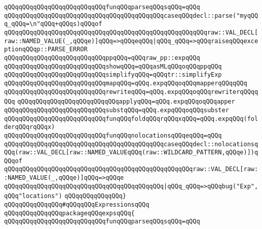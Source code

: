 \verb|qQQqqQQqqQQqqQQqqQQqqQQqqQQqfunqQQqparseqQQqsqQQq=qQQq|\newline
\verb|qQQqqQQqqQQqqQQqqQQqqQQqqQQqqQQqqQQqqQQqqQQqcaseqQQqdecl::parse("myqQQq_qQQq=\n"qQQq+qQQqs)qQQqof|\newline
\verb|qQQqqQQqqQQqqQQqqQQqqQQqqQQqqQQqqQQqqQQqqQQqqQQqqQQqqQQqraw::VAL_DECL[raw::NAMED_VALUE(_,qQQqe)]qQQq=>qQQqeqQQq|\verb#|qQQq_qQQq=>qQQqraiseqQQqexceptionqQQqp::PARSE_ERROR#\newline
\newline
\verb|qQQqqQQqqQQqqQQqqQQqqQQqqQQqppqQQq=qQQqraw_pp::expqQQq|\newline
\verb|qQQqqQQqqQQqqQQqqQQqqQQqqQQqshowqQQq=qQQqasMLqQQqoqQQqppqQQq|\newline
\verb|qQQqqQQqqQQqqQQqqQQqqQQqqQQqsimplifyqQQq=qQQqtr::simplifyExp|\newline
\verb|qQQqqQQqqQQqqQQqqQQqqQQqqQQqmapqQQq=qQQq.expqQQqoqQQqmapperqQQqqQQq|\newline
\verb|qQQqqQQqqQQqqQQqqQQqqQQqqQQqrewriteqQQq=qQQq.expqQQqoqQQqrewriterqQQqqQQq|\newline
\verb|qQQqqQQqqQQqqQQqqQQqqQQqqQQqapplyqQQq=qQQq.expqQQqoqQQqapper|\newline
\verb|qQQqqQQqqQQqqQQqqQQqqQQqqQQqsubstqQQq=qQQq.expqQQqoqQQqsubster|\newline
\newline
\verb|qQQqqQQqqQQqqQQqqQQqqQQqqQQqfunqQQqfoldqQQqrqQQqxqQQq=qQQq.expqQQq(folderqQQqrqQQqx)|\newline
\newline
\verb|qQQqqQQqqQQqqQQqqQQqqQQqqQQqfunqQQqnolocationsqQQqeqQQq=qQQq|\newline
\verb|qQQqqQQqqQQqqQQqqQQqqQQqqQQqqQQqqQQqqQQqqQQqcaseqQQqdecl::nolocationsqQQq(raw::VAL_DECL[raw::NAMED_VALUEqQQq(raw::WILDCARD_PATTERN,qQQqe)])qQQqof|\newline
\verb|qQQqqQQqqQQqqQQqqQQqqQQqqQQqqQQqqQQqqQQqqQQqqQQqqQQqraw::VAL_DECL[raw::NAMED_VALUE(_,qQQqe)]qQQq=>qQQqe|\newline
\verb|qQQqqQQqqQQqqQQqqQQqqQQqqQQqqQQqqQQqqQQqqQQq|\verb#|qQQq_qQQq=>qQQqbug("Exp",qQQq"locations")#\newline
\verb|qQQqqQQqqQQqqQQq}|\newline
\newline
\verb|qQQqqQQqqQQqqQQq#qQQqqQQqExpressionsqQQq|\newline
\verb|qQQqqQQqqQQqqQQqpackageqQQqexpsqQQq{|\newline
\newline
\verb|qQQqqQQqqQQqqQQqqQQqqQQqqQQqfunqQQqparseqQQqsqQQq=qQQq|\newline
